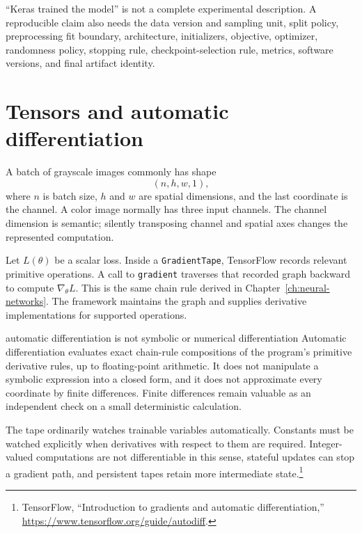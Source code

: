 \begin{misconceptionbox}
``Keras trained the model'' is not a complete experimental description. A
reproducible claim also needs the data version and sampling unit, split policy,
preprocessing fit boundary, architecture, initializers, objective, optimizer,
randomness policy, stopping rule, checkpoint-selection rule, metrics, software
versions, and final artifact identity.
\end{misconceptionbox}

\section{Tensors and automatic differentiation}

A batch of grayscale images commonly has shape
\[
  (n,h,w,1),
\]
where $n$ is batch size, $h$ and $w$ are spatial dimensions, and the last
coordinate is the channel. A color image normally has three input channels.
The channel dimension is semantic; silently transposing channel and spatial
axes changes the represented computation.

Let $L(\theta)$ be a scalar loss. Inside a \texttt{GradientTape}, TensorFlow
records relevant primitive operations. A call to \texttt{gradient} traverses
that recorded graph backward to compute $\nabla_\theta L$. This is the same
chain rule derived in Chapter~\ref{ch:neural-networks}. The framework maintains
the graph and supplies derivative implementations for supported operations.

\begin{definitionbox}{automatic differentiation is not symbolic or numerical differentiation}
Automatic differentiation evaluates exact chain-rule compositions of the
program's primitive derivative rules, up to floating-point arithmetic. It
does not manipulate a symbolic expression into a closed form, and it does not
approximate every coordinate by finite differences. Finite differences remain
valuable as an independent check on a small deterministic calculation.
\end{definitionbox}

The tape ordinarily watches trainable variables automatically. Constants must
be watched explicitly when derivatives with respect to them are required.
Integer-valued computations are not differentiable in this sense, stateful
updates can stop a gradient path, and persistent tapes retain more intermediate
state.\footnote{TensorFlow, ``Introduction to gradients and automatic
differentiation,'' \url{https://www.tensorflow.org/guide/autodiff}.}

